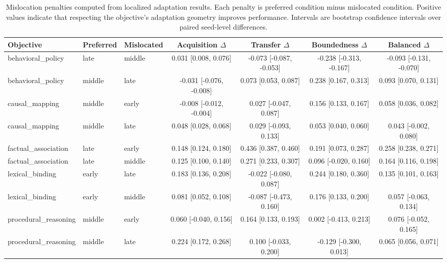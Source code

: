 \begin{table}[t]
\centering
\scriptsize
\setlength{\tabcolsep}{3pt}
\begin{tabular}{lllcccc}
\toprule
Objective & Preferred & Mislocated & Acquisition $\Delta$ & Transfer $\Delta$ & Boundedness $\Delta$ & Balanced $\Delta$ \\
\midrule
behavioral\_policy & late & middle & 0.031 [0.008, 0.076] & -0.073 [-0.087, -0.053] & -0.238 [-0.313, -0.167] & -0.093 [-0.131, -0.070] \\
behavioral\_policy & middle & late & -0.031 [-0.076, -0.008] & 0.073 [0.053, 0.087] & 0.238 [0.167, 0.313] & 0.093 [0.070, 0.131] \\
causal\_mapping & middle & early & -0.008 [-0.012, -0.004] & 0.027 [-0.047, 0.087] & 0.156 [0.133, 0.167] & 0.058 [0.036, 0.082] \\
causal\_mapping & middle & late & 0.048 [0.028, 0.068] & 0.029 [-0.093, 0.133] & 0.053 [0.040, 0.060] & 0.043 [-0.002, 0.080] \\
factual\_association & late & early & 0.148 [0.124, 0.180] & 0.436 [0.387, 0.460] & 0.191 [0.073, 0.287] & 0.258 [0.238, 0.271] \\
factual\_association & late & middle & 0.125 [0.100, 0.140] & 0.271 [0.233, 0.307] & 0.096 [-0.020, 0.160] & 0.164 [0.116, 0.198] \\
lexical\_binding & early & late & 0.183 [0.136, 0.208] & -0.022 [-0.080, 0.087] & 0.244 [0.180, 0.360] & 0.135 [0.101, 0.163] \\
lexical\_binding & early & middle & 0.081 [0.052, 0.108] & -0.087 [-0.473, 0.160] & 0.176 [0.133, 0.200] & 0.057 [-0.063, 0.134] \\
procedural\_reasoning & middle & early & 0.060 [-0.040, 0.156] & 0.164 [0.133, 0.193] & 0.002 [-0.413, 0.213] & 0.076 [-0.052, 0.165] \\
procedural\_reasoning & middle & late & 0.224 [0.172, 0.268] & 0.100 [-0.033, 0.200] & -0.129 [-0.300, 0.013] & 0.065 [0.056, 0.071] \\
\bottomrule
\end{tabular}
\caption{Mislocation penalties computed from localized adaptation results. Each penalty is preferred condition minus mislocated condition. Positive values indicate that respecting the objective's adaptation geometry improves performance. Intervals are bootstrap confidence intervals over paired seed-level differences.}
\label{tab:mislocation-penalties}
\end{table}
